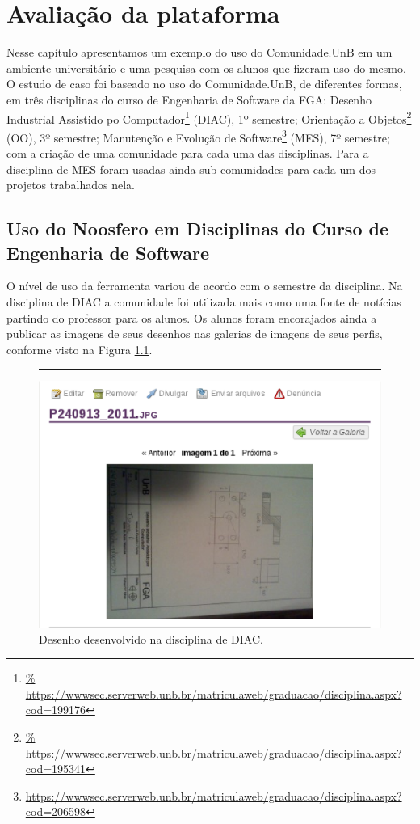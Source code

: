 \chapter{Avaliação da plataforma}

Nesse capítulo apresentamos um exemplo do uso do Comunidade.UnB em um ambiente
universitário e uma pesquisa com os alunos que fizeram uso do mesmo.
%
O estudo de caso foi baseado no uso do Comunidade.UnB, de diferentes formas, em
três disciplinas do curso de Engenharia de Software da FGA:
%
Desenho Industrial Assistido po Computador\footnote{\url{%
https://wwwsec.serverweb.unb.br/matriculaweb/graduacao/disciplina.aspx?cod=199176}} (DIAC), 1º semestre;
%
Orientação a Objetos\footnote{\url{%
https://wwwsec.serverweb.unb.br/matriculaweb/graduacao/disciplina.aspx?cod=195341}}
(OO), 3º semestre;
%
Manutenção e Evolução de Software\footnote{\url{
https://wwwsec.serverweb.unb.br/matriculaweb/graduacao/disciplina.aspx?cod=206598}}
(MES), 7º semestre;
%
com a criação de uma comunidade para cada uma das disciplinas. Para a disciplina de
MES foram usadas ainda sub-comunidades para cada um dos projetos trabalhados nela.

\section{Uso do Noosfero em Disciplinas do Curso de Engenharia de Software}
\label{mes-unb}

O nível de uso da ferramenta variou de acordo com o semestre da disciplina. Na
disciplina de DIAC a comunidade foi utilizada mais como uma fonte de notícias
partindo do professor para os alunos. Os alunos foram encorajados ainda a publicar
as imagens de seus desenhos nas galerias de imagens de seus perfis, conforme
visto na Figura \ref{imagem-diac}.

\begin{figure}[h!]
    \centering
		\rule{1cm}{1cm}
    \includegraphics[keepaspectratio=true,scale=0.65]
      {figuras/imagem-diac.eps}
    \caption{Desenho desenvolvido na disciplina de DIAC.}
    \label{imagem-diac}
\end{figure}


